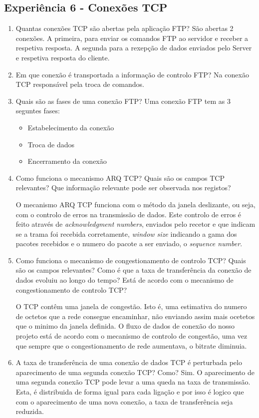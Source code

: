 \documentclass{article}
\begin{document}
\subsection{Experiência 6 - Conexões TCP}
\begin{enumerate}
\item Quantas conexões TCP são abertas pela aplicação FTP?
São abertas 2 conexões. A primeira, para enviar os comandos FTP ao servidor e receber a respetiva resposta.
A segunda para a rexepção de dados enviados pelo Server e respetiva resposta do cliente.

\item Em que conexão é transportada a informação de controlo FTP?
Na conexão TCP responsável pela troca de comandos.
\item Quais são as fases de uma conexão FTP?
Uma conexão FTP tem as 3 seguntes fases:
\begin{itemize}
    \item Estabelecimento da conexão
    \item Troca de dados
    \item Encerramento da conexão
\end{itemize}


\item Como funciona o mecanismo ARQ TCP? Quais são os campos TCP relevantes? Que informação relevante pode ser observada nos
registos?

O mecanismo ARQ TCP funciona com o método da janela deslizante, ou seja, com o controlo de erros na transmissão de dados. 
Este controlo de erros é feito através de \textit{acknowledgment numbers}, enviados pelo recetor e que indicam se a trama foi recebida corretamente, \textit{window size} indicando a gama dos pacotes recebidos e o numero do pacote a ser enviado, o \textit{sequence number}.

\item Como funciona o mecanismo de congestionamento de controlo TCP? Quais são os campos relevantes? Como é que
a taxa de transferência da conexão de dados evoluiu ao longo do tempo? Está de acordo com o mecanismo de congestionamento de controlo TCP?

O TCP contêm uma janela de congestão. Isto é, uma estimativa do numero de octetos que a rede consegue encaminhar, não enviando assim mais ocetetos que o minimo da janela definida.
O fluxo de dados de conexão do nosso projeto está de acordo com o mecanismo de controlo de congestão, uma vez que sempre que o congestionamento de rede aumentava, o bitrate diminuia.

\item A taxa de transferência de uma conexão de dados TCP é perturbada pelo aparecimento de uma segunda conexão TCP? Como?
Sim. O aparecimento de uma segunda conexão TCP pode levar a uma queda na taxa de transmissão. Esta, é distribuida de forma igual para cada ligação e por isso é logico que com o aparecimento de uma nova conexão, a taxa de transferência seja reduzida.

\end{enumerate}
\end{document}
